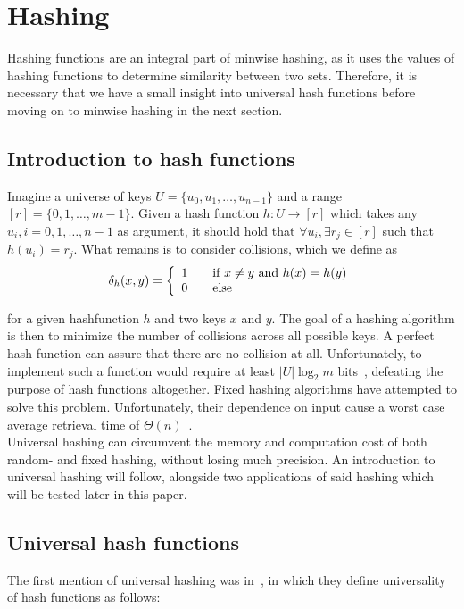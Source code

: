 \documentclass[../../main.tex]{subfiles}
\begin{document}
\section{Hashing}
Hashing functions are an integral part of minwise hashing, as it uses the values of hashing functions to determine similarity between two sets. Therefore, it is necessary that we have a small insight into universal hash functions before moving on to minwise hashing in the next section.

\subsection{Introduction to hash functions}
Imagine a universe of keys $U=\{u_{0},u_{1},\ldots,u_{n-1}\}$ and a range $[r]=\{0,1,\ldots,m-1\}$. Given a hash function $h:U\rightarrow [r]$ which takes any $u_i,i=0,1,\ldots,n-1$ as argument, it should hold that $\forall u_i,\exists r_j \in [r]$ such that $h(u_i)= r_j$. What remains is to consider collisions, which we define as
\begin{equation}\label{collision}
\delta_h(x,y) = \left\{ 
  \begin{array}{l l}
    1 & \quad \text{if $x\neq y$ and $h(x)=h(y)$}\\
    0 & \quad \text{else}
  \end{array} \right.
\end{equation}

for a given hashfunction $h$ and two keys $x$ and $y$. The goal of a hashing algorithm is then to minimize the number of collisions across all possible keys. A perfect hash function can assure that there are no collision at all. Unfortunately, to implement such a function would require at least $|U|\log_2 m$ bits~\cite{dikuHash}, defeating the purpose of hash functions altogether. Fixed hashing algorithms have attempted to solve this problem. Unfortunately, their dependence on input cause a worst case average retrieval time of $\Theta(n)$~\cite{introToAlg}.\\

Universal hashing can circumvent the memory and computation cost of both random- and fixed hashing, without losing much precision. An introduction to universal hashing will follow, alongside two applications of said hashing which will be tested later in this paper.

\subsection{Universal hash functions}
The first mention of universal hashing was in~\cite{carterWegman}, in which they define universality of hash functions as follows:\\
\end{document}
